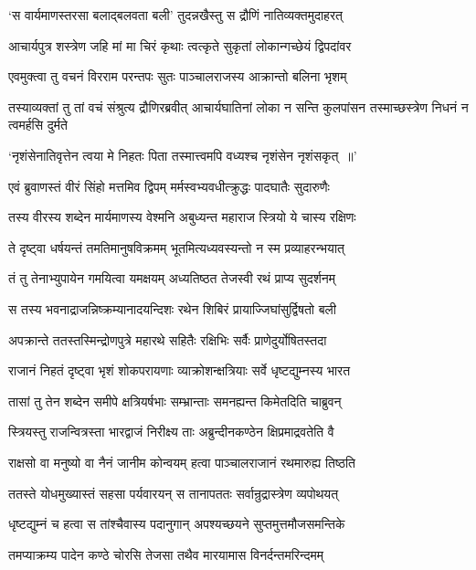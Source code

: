 \twolineshloka
{`स वार्यमाणस्तरसा बलाद्बलवता बली'}
{तुदन्नखैस्तु स द्रौणिं नातिव्यक्तमुदाहरत्}


\twolineshloka
{आचार्यपुत्र शस्त्रेण जहि मां मा चिरं कृथाः}
{त्वत्कृते सुकृतां लोकान्गच्छेयं द्विपदांवर}


\twolineshloka
{एवमुक्त्वा तु वचनं विरराम परन्तपः}
{सुतः पाञ्चालराजस्य आक्रान्तो बलिना भृशम्}


\threelineshloka
{तस्याव्यक्तां तु तां वचं संश्रुत्य द्रौणिरब्रवीत्}
{आचार्यघातिनां लोका न सन्ति कुलपांसन}
{तस्माच्छस्त्रेण निधनं न त्वमर्हसि दुर्मते}


\twolineshloka
{`नृशंसेनातिवृत्तेन त्वया मे निहतः पिता}
{तस्मात्त्वमपि वध्यश्च नृशंसेन नृशंसकृत् ॥'}


\twolineshloka
{एवं ब्रुवाणस्तं वीरं सिंहो मत्तमिव द्विपम्}
{मर्मस्वभ्यवधीत्क्रुद्धः पादघातैः सुदारुणैः}


\twolineshloka
{तस्य वीरस्य शब्देन मार्यमाणस्य वेश्मनि}
{अबुध्यन्त महाराज स्त्रियो ये चास्य रक्षिणः}


\twolineshloka
{ते दृष्ट्वा धर्षयन्तं तमतिमानुषविक्रमम्}
{भूतमित्यध्यवस्यन्तो न स्म प्रव्याहरन्भयात्}


\twolineshloka
{तं तु तेनाभ्युपायेन गमयित्वा यमक्षयम्}
{अध्यतिष्ठत तेजस्वी रथं प्राप्य सुदर्शनम्}


\twolineshloka
{स तस्य भवनाद्राजन्निष्क्रम्यानादयन्दिशः}
{रथेन शिबिरं प्रायाज्जिघांसुर्द्विषतो बली}


\twolineshloka
{अपक्रान्ते ततस्तस्मिन्द्रोणपुत्रे महारथे}
{सहितैः रक्षिभिः सर्वैः प्राणेदुर्योषितस्तदा}


\twolineshloka
{राजानं निहतं दृष्ट्वा भृशं शोकपरायणाः}
{व्याक्रोशन्क्षत्रियाः सर्वे धृष्टद्युम्नस्य भारत}


\twolineshloka
{तासां तु तेन शब्देन समीपे क्षत्रियर्षभाः}
{सम्भ्रान्ताः समनह्यन्त किमेतदिति चाब्रुवन्}


\twolineshloka
{स्त्रियस्तु राजन्वित्रस्ता भारद्वाजं निरीक्ष्य ताः}
{अब्रुन्दीनकण्ठेन क्षिप्रमाद्रवतेति वै}


\twolineshloka
{राक्षसो वा मनुष्यो वा नैनं जानीम कोन्वयम्}
{हत्वा पाञ्चालराजानं रथमारुह्य तिष्ठति}


\twolineshloka
{ततस्ते योधमुख्यास्तं सहसा पर्यवारयन्}
{स तानापततः सर्वान्रुद्रास्त्रेण व्यपोथयत्}


\twolineshloka
{धृष्टद्युम्नं च हत्वा स तांश्चैवास्य पदानुगान्}
{अपश्यच्छयने सुप्तमुत्तमौजसमन्तिके}


\twolineshloka
{तमप्याक्रम्य पादेन कण्ठे चोरसि तेजसा}
{तथैव मारयामास विनर्दन्तमरिन्दमम्}


